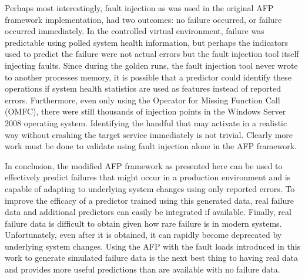 Perhaps most interestingly, fault injection as was used in the original
\ac{AFP} framework implementation, had two outcomes: no failure occurred, or
failure occurred immediately.  In the controlled virtual environment, failure
was predictable using polled system health information, but perhaps the
indicators used to predict the failure were not actual errors but the fault
injection tool itself injecting faults.  Since during the golden runs, the
fault injection tool never wrote to another processes memory, it is possible
that a predictor could identify these operations if system health statistics
are used as features instead of reported errors.  Furthermore, even only using
the Operator for Missing Function Call (OMFC), there were still thousands of
injection points in the Windows Server 2008 operating system.  Identifying the
handful that may activate in a realistic way without crashing the target
service immediately is not trivial.  Clearly more work must be done to validate
using fault injection alone in the \ac{AFP} framework.

In conclusion, the modified \ac{AFP} framework as presented here can be used to
effectively predict failures that might occur in a production environment and
is capable of adapting to underlying system changes using only reported errors.
To improve the efficacy of a predictor trained using this generated data, real
failure data and additional predictors can easily be integrated if available.
Finally, real failure data is difficult to obtain given how rare failure is in
modern systems.  Unfortunately, even after it is obtained, it can rapidly
become deprecated by underlying system changes.  Using the \ac{AFP} with the
fault loads introduced in this work to generate simulated failure data is the
next best thing to having real data and provides more useful predictions than
are available with no failure data.
